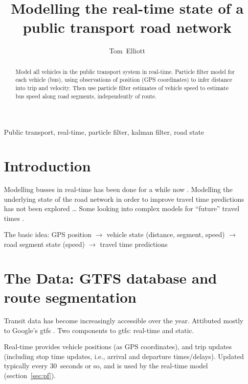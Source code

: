 \documentclass[draftcls,a4paper,onecolumn]{IEEEtran}\usepackage[]{graphicx}\usepackage[]{color}
\title{Modelling the real-time state of a public transport road network}
\author{Tom~Elliott}
\begin{document}
\maketitle


\begin{abstract}
  Model all vehicles in the public transport system in real-time.
  Particle filter model for each vehicle (bus),
  using observations of position (GPS coordinates) to infer distance into trip
  and velocity.
  Then use particle filter estimates of vehicle speed to estimate bus speed along
  road segments, independently of route.
 
\end{abstract}



\begin{IEEEkeywords}
  Public transport, real-time, particle filter, kalman filter, road state
\end{IEEEkeywords}

\section{Introduction}
\label{sec:intro}


Modelling busses in real-time has been done for a while now 
\cite{Cats_2015,Chen_2014,Hans_2015,Jeong_2005,TCRP_2003,Wessel_2016,Xinghao_2013}.
Modelling the underlying state of the road network in order to improve 
travel time predictions has not been explored \ldots
Some looking into complex models for ``future'' travel times 
\cite{Julio_2016,Xinghao_2013,Yichen_Zheng_2016,Yu_2011}.


The basic idea:
GPS position $\rightarrow$ 
vehicle state (distance, segment, speed) $\rightarrow$
road segment state (speed) $\rightarrow$
travel time predictions



\section{The Data: GTFS database and route segmentation}
\label{sec:data}

Transit data has become increasingly accessible over the year.
Attibuted mostly to Google's \gls{gtfs} \cite{GoogleDevelopers_2006}.
Two components to \gls{gtfs}: real-time and static.

Real-time provides vehicle positions (as GPS coordinates),
and trip updates (including stop time updates, 
i.e., arrival and departure times/delays).
Updated typically every 30~seconds or so,
and is used by the real-time model (section~\ref{sec:pf}).
\end{document}
